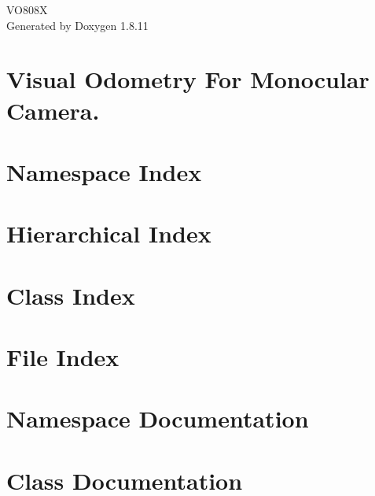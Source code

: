 \documentclass[twoside]{book}
\newcommand{\+}{\discretionary{\mbox{\scriptsize$\hookleftarrow$}}{}{}}
\newcommand{\clearemptydoublepage}{%
  \newpage{\pagestyle{empty}\cleardoublepage}%
}
\begin{document}
\hypersetup{pageanchor=false,
             bookmarksnumbered=true,
             pdfencoding=unicode
            }
\begin{titlepage}
\vspace*{7cm}
\begin{center}%
{\Large V\+O808X }\\
\vspace*{1cm}
{\large Generated by Doxygen 1.8.11}\\
\end{center}
\end{titlepage}
\clearemptydoublepage
\tableofcontents
\clearemptydoublepage
{}
\hypersetup{pageanchor=true}

\chapter{Visual Odometry For Monocular Camera.}
\label{md__home_bhargavi_Documents_SDR_Copy_Exam_808X_readme}
\hypertarget{md__home_bhargavi_Documents_SDR_Copy_Exam_808X_readme}{}

\chapter{Namespace Index}

\chapter{Hierarchical Index}

\chapter{Class Index}

\chapter{File Index}

\chapter{Namespace Documentation}

\chapter{Class Documentation}
















\end{document}
